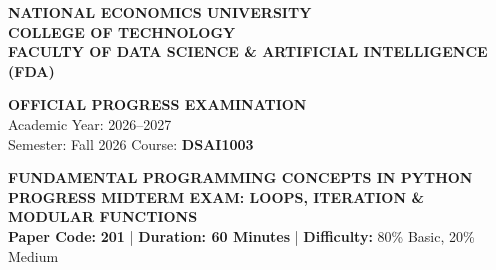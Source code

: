 \documentclass[11pt,a4paper]{article}
\begin{document}

\noindent
\begin{minipage}[t]{0.64\textwidth}
  \raggedright\small
  \textbf{NATIONAL ECONOMICS UNIVERSITY}\\
  \textbf{COLLEGE OF TECHNOLOGY}\\
  \textbf{FACULTY OF DATA SCIENCE \& ARTIFICIAL INTELLIGENCE (FDA)}
\end{minipage}%
\hfill
\begin{minipage}[t]{0.34\textwidth}
  \raggedleft\footnotesize
  \textbf{OFFICIAL PROGRESS EXAMINATION}\\
  Academic Year: 2026--2027\\
  Semester: Fall 2026 \quad Course: \textbf{DSAI1003}
\end{minipage}

\vspace{0.08em}

\begin{center}
  {\large\bfseries\color{primaryblue} FUNDAMENTAL PROGRAMMING CONCEPTS IN PYTHON}\\[0.04em]
  {\normalsize\bfseries PROGRESS MIDTERM EXAM: LOOPS, ITERATION \& MODULAR FUNCTIONS}\\[0.04em]
  {\footnotesize\textbf{Paper Code:} \textbf{201} \quad | \quad \textbf{Duration: 60 Minutes} \quad | \quad \textbf{Difficulty:} 80\% Basic, 20\% Medium}
\end{center}

\vspace{0.04em}
\end{document}

